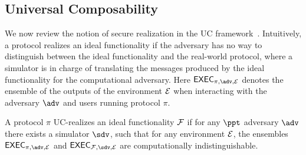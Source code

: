 \subsection{Universal Composability}
\label{sec:uc}

We now review the notion of secure realization in the UC framework~\cite{canetti}. 
Intuitively, a protocol realizes an ideal functionality if the adversary has no way 
to distinguish between the ideal functionality and the real-world protocol, where 
a simulator is in charge of translating the messages produced by the ideal functionality 
for the computational adversary. Here $\exec_{\pi, \adv, \dist}$ denotes the ensemble of 
the outputs of the environment $\mathcal{E}$ when interacting with the adversary $\adv$ and 
users running protocol $\pi$.

\begin{definition}
A protocol $\pi$ UC-realizes an ideal functionality $\mathcal{F}$ if for any $\ppt$ adversary 
$\adv$ there exists a simulator $\sdv$, such that for any environment $\mathcal{E}$, the 
ensembles $\exec_{\pi, \adv, \dist}$ and $\exec_{\FF, \sdv, \dist}$ are computationally 
indistinguishable.
\end{definition}

